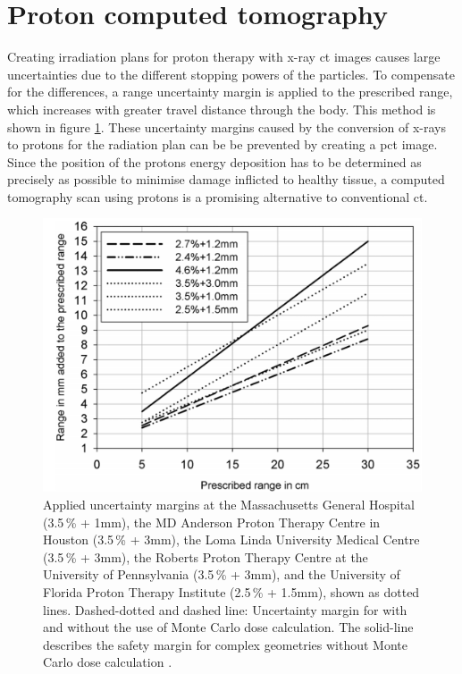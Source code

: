 \section{Proton computed tomography}
Creating irradiation plans for proton therapy with x-ray ct images causes large uncertainties due to the different stopping powers of the particles.
To compensate for the differences, a range uncertainty margin is applied to the prescribed range, which increases with greater travel distance through the body. This
method is shown in figure \ref{fig:paganetti}. These uncertainty margins caused by the conversion of x-rays to protons for the radiation plan can be be prevented by creating a pct image.
Since the position of the protons energy deposition has to be determined as precisely as possible to minimise damage inflicted to healthy tissue, a computed tomography scan using protons
is a promising alternative to conventional ct.

\begin{figure}
  \centering
  \includegraphics[height=0.6\textwidth]{images/prescription.png}
  \caption{Applied uncertainty margins at the Massachusetts General Hospital (3.5\,\% +
1mm), the MD Anderson Proton Therapy Centre in Houston (3.5\,\% + 3mm), the Loma Linda
University Medical Centre (3.5\,\% + 3mm), the Roberts Proton Therapy Centre at the
University of Pennsylvania (3.5\,\% + 3mm), and the University of Florida Proton Therapy
Institute (2.5\,\% + 1.5mm), shown as dotted lines. Dashed-dotted and dashed line: Uncertainty margin for with and without the use of Monte Carlo dose calculation.
The solid-line describes the safety margin for complex geometries without Monte Carlo dose calculation \cite{paganetti}.}
  \label{fig:paganetti}
\end{figure}

